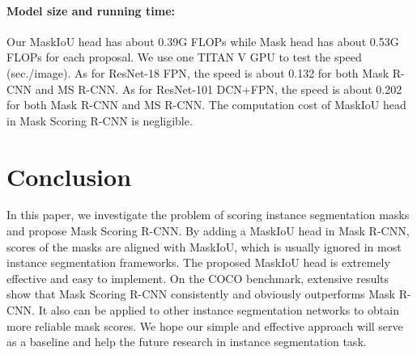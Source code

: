 \documentclass[10pt,twocolumn,letterpaper]{article}
\begin{document}
\paragraph{Model size and running time:}
    Our MaskIoU head has about 0.39G FLOPs while Mask head has about 0.53G FLOPs for each proposal. 
We use one TITAN V GPU to test the speed (sec./image). As for ResNet-18 FPN, the speed is about 0.132 for both Mask R-CNN and MS R-CNN. As for ResNet-101 DCN+FPN, the speed is about 0.202 for both Mask R-CNN and MS R-CNN. The computation cost of MaskIoU head in Mask Scoring R-CNN is negligible. 

\section{Conclusion}
In this paper, we investigate the problem of scoring instance segmentation masks and propose Mask Scoring R-CNN. By adding a MaskIoU head in Mask R-CNN, scores of the masks are aligned with MaskIoU, which is usually ignored in most instance segmentation frameworks. 
    The proposed MaskIoU head is extremely effective and easy to implement. On the COCO benchmark, extensive results show that Mask Scoring R-CNN consistently and obviously outperforms Mask R-CNN. It also can be applied to other instance segmentation networks to obtain more reliable mask scores. We hope our simple and effective approach will serve as a baseline and help the future research in instance segmentation task. 
    


{\small


}
\end{document}
